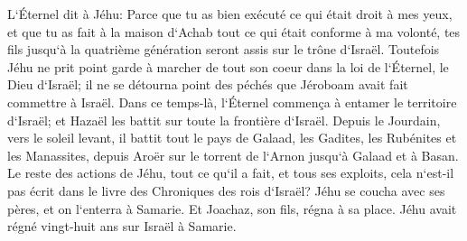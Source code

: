 \verse L`Éternel dit à Jéhu: Parce que tu as bien exécuté ce qui était droit à mes yeux, et que tu as fait à la maison d`Achab tout ce qui était conforme à ma volonté, tes fils jusqu`à la quatrième génération seront assis sur le trône d`Israël. 
\verse Toutefois Jéhu ne prit point garde à marcher de tout son coeur dans la loi de l`Éternel, le Dieu d`Israël; il ne se détourna point des péchés que Jéroboam avait fait commettre à Israël. 
\verse Dans ce temps-là, l`Éternel commença à entamer le territoire d`Israël; et Hazaël les battit sur toute la frontière d`Israël. 
\verse Depuis le Jourdain, vers le soleil levant, il battit tout le pays de Galaad, les Gadites, les Rubénites et les Manassites, depuis Aroër sur le torrent de l`Arnon jusqu`à Galaad et à Basan. 
\verse Le reste des actions de Jéhu, tout ce qu`il a fait, et tous ses exploits, cela n`est-il pas écrit dans le livre des Chroniques des rois d`Israël? 
\verse Jéhu se coucha avec ses pères, et on l`enterra à Samarie. Et Joachaz, son fils, régna à sa place. 
\verse Jéhu avait régné vingt-huit ans sur Israël à Samarie. 

\chapter{}

